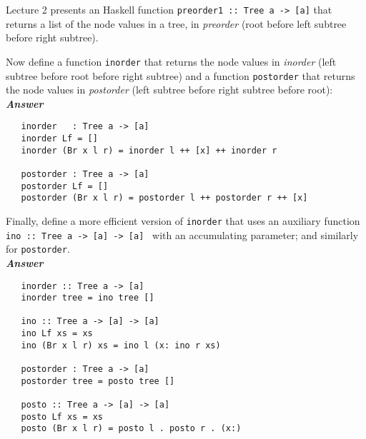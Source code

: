 \documentclass[a4paper]{article}
\begin{document}
\begin{exercise}\label{exer-tree-traversal}
  Lecture 2 presents an Haskell function \texttt{preorder1 ::\ Tree a ->
    [a]} that returns a list of the node values in a tree, in
  \emph{preorder} (root before left subtree before right subtree).
  
  Now define a function \texttt{inorder} that returns the node values
  in \emph{inorder} (left subtree before root before right subtree)
  and a function \texttt{postorder} that returns the node values in
  \emph{postorder} (left subtree before right subtree before root):\\
  
\noindent
\textbf{\emph{Answer}}
{\codesetup\begin{verbatim}
   inorder   : Tree a -> [a]
   inorder Lf = []
   inorder (Br x l r) = inorder l ++ [x] ++ inorder r
   
   postorder : Tree a -> [a]
   postorder Lf = []
   postorder (Br x l r) = postorder l ++ postorder r ++ [x]
\end{verbatim}}

\noindent 
Finally, define a more efficient version of \texttt{inorder} that
  uses an auxiliary function \texttt{ino ::\ Tree a -> [a] -> [a]
    } with an accumulating parameter; and similarly for
  \texttt{postorder}.  \\
  
  \noindent
\textbf{\emph{Answer}}
{\codesetup\begin{verbatim}
   inorder :: Tree a -> [a]
   inorder tree = ino tree []
   
   ino :: Tree a -> [a] -> [a]
   ino Lf xs = xs
   ino (Br x l r) xs = ino l (x: ino r xs)
   
   postorder : Tree a -> [a]
   postorder tree = posto tree []
   
   posto :: Tree a -> [a] -> [a]
   posto Lf xs = xs
   posto (Br x l r) = posto l . posto r . (x:)
\end{verbatim}}
\end{exercise}
\end{document}
